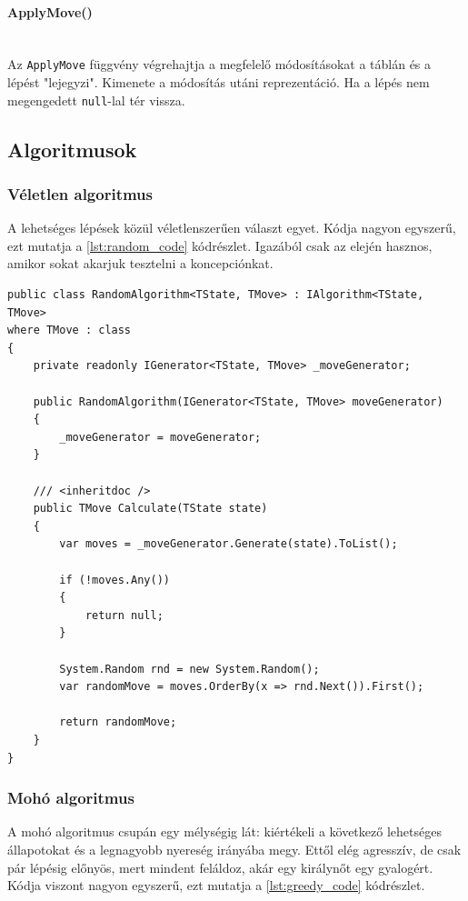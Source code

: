 \documentclass[twoside, a4paper, 12pt]{article}
\begin{document}
\paragraph{ApplyMove()} \mbox{} \\
Az \texttt{ApplyMove} függvény végrehajtja a megfelelő módosításokat a táblán és a lépést "lejegyzi". Kimenete a módosítás utáni reprezentáció. Ha a lépés nem megengedett \texttt{null}-lal tér vissza.






\newpage
\subsection{Algoritmusok}

\subsubsection{Véletlen algoritmus}
A lehetséges lépések közül véletlenszerűen választ egyet. Kódja nagyon egyszerű, ezt mutatja a \ref{lst:random_code} kódrészlet. Igazából csak az elején hasznos, amikor sokat akarjuk tesztelni a koncepciónkat.

\begin{lstlisting}[caption=Véletlen algoritmus, label=lst:random_code, float]
public class RandomAlgorithm<TState, TMove> : IAlgorithm<TState, TMove>
where TMove : class
{
	private readonly IGenerator<TState, TMove> _moveGenerator;
	
	public RandomAlgorithm(IGenerator<TState, TMove> moveGenerator)
	{
		_moveGenerator = moveGenerator;
	}
	
	/// <inheritdoc />
	public TMove Calculate(TState state)
	{
		var moves = _moveGenerator.Generate(state).ToList();
		
		if (!moves.Any())
		{
			return null;
		}
		
		System.Random rnd = new System.Random();
		var randomMove = moves.OrderBy(x => rnd.Next()).First();
		
		return randomMove;
	}
}
\end{lstlisting}

\subsubsection{Mohó algoritmus}
A mohó algoritmus csupán egy mélységig lát: kiértékeli a következő lehetséges állapotokat és a legnagyobb nyereség irányába megy. Ettől elég agresszív, de csak pár lépésig előnyös, mert mindent feláldoz, akár egy királynőt egy gyalogért. Kódja viszont nagyon egyszerű, ezt mutatja a \ref{lst:greedy_code} kódrészlet.
\end{document}
